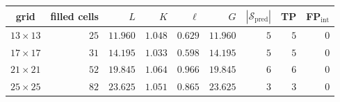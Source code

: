 \small
\setlength{\tabcolsep}{5pt}
\begin{tabular}{crrrrrrrr}
\toprule
grid           & filled cells & $L$      & $K$     & $\ell$  & $G$      & $|\mathcal{S}_{\mathrm{pred}}|$ & TP & FP$_{\mathrm{int}}$ \\
\midrule
$13 \times 13$ & $25$         & $11.960$ & $1.048$ & $0.629$ & $11.960$ & $5$ & $5$ & $0$ \\
$17 \times 17$ & $31$         & $14.195$ & $1.033$ & $0.598$ & $14.195$ & $5$ & $5$ & $0$ \\
$21 \times 21$ & $52$         & $19.845$ & $1.064$ & $0.966$ & $19.845$ & $6$ & $6$ & $0$ \\
$25 \times 25$ & $82$         & $23.625$ & $1.051$ & $0.865$ & $23.625$ & $3$ & $3$ & $0$ \\
\bottomrule
\end{tabular}
